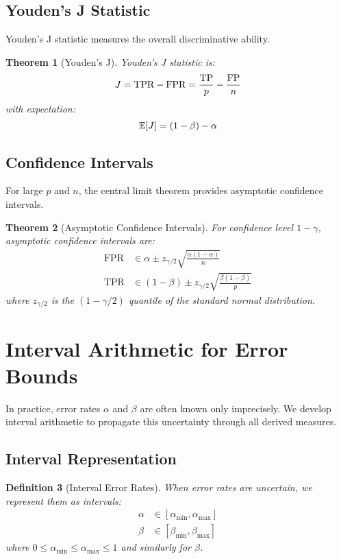 \documentclass[11pt]{article}
\newcommand{\Youden}{J}       %
\newcommand{\Interval}[2]{[#1, #2]} %
\newtheorem{theorem}{Theorem}[section]
\newtheorem{definition}[theorem]{Definition}
\begin{document}
\subsection{Youden's J Statistic}

Youden's J statistic measures the overall discriminative ability.

\begin{theorem}[Youden's J]
Youden's J statistic is:
\[
\Youden = \text{TPR} - \text{FPR} = \frac{\TP}{p} - \frac{\FP}{n}
\]
with expectation:
\[
\Expect[\Youden] = (1-\beta) - \alpha
\]
\end{theorem}

\subsection{Confidence Intervals}

For large $p$ and $n$, the central limit theorem provides asymptotic confidence intervals.

\begin{theorem}[Asymptotic Confidence Intervals]
For confidence level $1-\gamma$, asymptotic confidence intervals are:
\begin{align}
\text{FPR} &\in \alpha \pm z_{\gamma/2}\sqrt{\frac{\alpha(1-\alpha)}{n}} \\
\text{TPR} &\in (1-\beta) \pm z_{\gamma/2}\sqrt{\frac{\beta(1-\beta)}{p}}
\end{align}
where $z_{\gamma/2}$ is the $(1-\gamma/2)$ quantile of the standard normal distribution.
\end{theorem}

\section{Interval Arithmetic for Error Bounds}
\label{sec:intervals}

In practice, error rates $\alpha$ and $\beta$ are often known only imprecisely. We develop interval arithmetic to propagate this uncertainty through all derived measures.

\subsection{Interval Representation}

\begin{definition}[Interval Error Rates]
When error rates are uncertain, we represent them as intervals:
\begin{align}
\alpha &\in \Interval{\alpha_{\min}}{\alpha_{\max}} \\
\beta &\in \Interval{\beta_{\min}}{\beta_{\max}}
\end{align}
where $0 \leq \alpha_{\min} \leq \alpha_{\max} \leq 1$ and similarly for $\beta$.
\end{definition}
\end{document}
